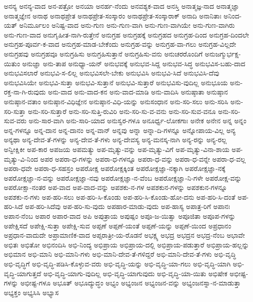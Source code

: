 {ಅನನ್ಯ
ಅನನ್ಯ-ವಾದ
ಅನ-ಪತ್ರೋ
ಅನಯಾ
ಅನರ್ಹ-ನೆಂದು
ಅನವಶ್ಯಕ-ವಾದ
ಅನಸ್ತಿ
ಅನಾತ್ಮಜ್ಞ-ನಾದ
ಅನಾತ್ಮಜ್ಞಾ
ಅನಾತ್ಮಜ್ಞೇನ
ಅನಾಥ
ಅನಾಥಪ್ರೇತ
ಅನಾಥಪ್ರೇತ-ಸಂಸ್ಕಾರಂ
ಅನಾಥಪ್ರೇತ-ಸಂಸ್ಕಾರಾಕ್
ಅನಾದಿ
ಅನಾನಿತಾಃ
ಅನಿಂದ-ಯತ್
ಅನಿರ್ಮೂಲಂ
ಅನಿಷ್ಟ-ವಾದ
ಅನು-ಗುಣ
ಅನು-ಗುಣ-ವಾಗಿ
ಅನು-ಗುಣ-ವಾಗಿಯೇ
ಅನು-ಗುಣ-ವಾಗಿರು
ಅನು-ಗುಣ-ವಾದ
ಅನುಗೃಹೀತ-ನಾಗಿ-ರುತ್ತೇನೆ
ಅನುಗ್ರಹ
ಅನುಗ್ರಹಕ್ಕೆ
ಅನುಗ್ರಹದ
ಅನುಗ್ರಹ-ದಿಂದ
ಅನುಗ್ರಹ-ದಿಂದಲೇ
ಅನುಗ್ರಹ-ಪೂರ್ವ-ಕ-ವಾದ
ಅನುಗ್ರಹ-ಮಾಡ-ಬೇಕೆಂದು
ಅನುಗ್ರಹ-ವನ್ನು
ಅನುಗ್ರಹ-ವಾ-ಗಲು
ಅನುಗ್ರಹ-ವಿಲ್ಲದೇ
ಅನುಗ್ರಹವು
ಅನುಗ್ರಹವೂ
ಅನುಗ್ರಹಿಸು
ಅನುಗ್ರಹಿಸುತ್ತಾನೆ
ಅನುಗ್ರಹಿಸು-ವನು
ಅನುಚರರೊಂದಿಗೆ
ಅನುಜಗ್ಮುರ್ಭಕ್ಷ-ಯಿತುಂ
ಅನುಜ್ಞಾ
ಅನು-ತಾಪ
ಅನುಧ್ಯಾ-ಯನ್
ಅನುಭವಕ್ಕೆ
ಅನುಭವ-ಸಿದ್ದ
ಅನುಭವ-ಸಿದ್ಧ
ಅನುಭವಿಸ-ಬಹು-ದಾದ
ಅನುಭವಿಸಲಾರೆ
ಅನುಭವಿ-ಸ-ಲಿಲ್ಲ
ಅನುಭವಿಸಲೇ-ಬೇಕು
ಅನುಭವಿಸಿ
ಅನುಭವಿ-ಸಿದೆ
ಅನುಭವಿಸಿ-ದೆವು
ಅನುಭವಿಸಿಯೇ
ಅನುಭವಿ-ಸುತ್ತಾ
ಅನುಭವಿ-ಸುತ್ತಾನೆ
ಅನುಭವಿ-ಸುತ್ತಾರೆ
ಅನುಭವಿಸು-ವುದಿಲ್ಲ
ಅನುಭೂಯ
ಅನು-ರಕ್ತ-ನಾ-ಗಿ-ರುವುದು
ಅನು-ವಾದ
ಅನು-ವಾದ-ಕನ
ಅನು-ವಾದ-ಮಾಡಿ
ಅನು-ವಾದಿಸಿ
ಅನುಷ್ಠಾತಾ
ಅನುಷ್ಠಾನ
ಅನುಷ್ಠಾನ-ವತಾಂ
ಅನುಷ್ಠಾನ-ವಿಧಿಜ್ಞೇನ
ಅನುಷ್ಠಾನ-ವಿಧಿ-ಯನ್ನು
ಅನುಸಂಧಾನ
ಅನು-ಸರಿ-ಸಲು
ಅನು-ಸರಿಸಿ
ಅನು-ಸರಿ-ಸುತ್ತಾ
ಅನು-ಸರಿ-ಸುತ್ತಾರೆ
ಅನು-ಸರಿ-ಸುತ್ತಿ-ರುವಿರಿ
ಅನು-ಸರಿ-ಸು-ವ-ವನು
ಅನು-ಸರಿ-ಸುವ-ವನೂ
ಅನು-ಸರಿ-ಸುವ-ವರು
ಅನು-ಸಾರ-ವಾಗಿ
ಅನು-ಸಾರಿ-ಯಾದ
ಅನುಸ್ವರ-ಗಳೂ
ಅನೂರ್ಧ್ವ-ಲೋಕಗಾಃ
ಅನೇಕ
ಅನೇನ
ಅನ್ನ
ಅನ್ನಂ
ಅನ್ನ-ಗಳನ್ನೂ
ಅನ್ನ-ದಾನ
ಅನ್ನ-ದಾನಂ
ಅನ್ನ-ವಾನ್
ಅನ್ನವು
ಅನ್ನಾ
ಅನ್ನಾ-ದಿ-ಗಳನ್ನೂ
ಅನ್ನೋಪಾಯ-ವಿಲ್ಲ
ಅನ್ಯ
ಅನ್ಯಥಾ
ಅನ್ಯ-ದೇವ-ತೆ-ಗಳನ್ನು
ಅನ್ಯ-ದೇವ-ತೆ-ಗಳು
ಅನ್ಯ-ದೇವಸ್ಯ
ಅನ್ಯ-ಮನಸ್ಕ-ನಾಗಿ
ಅನ್ಯ-ರನ್ನು
ಅನ್ಯ-ರಲ್ಲ
ಅನ್ವೀಕ್ಷಿಕೀ
ಅಪ-ಕಾರ
ಅಪಜಯ
ಅಪಮತ್ಯು
ಅಪ-ಮೃತ್ಯು-ವನ್ನು
ಅಪ-ಮೃತ್ಯು-ವಿಗೆ
ಅಪ-ಮೃತ್ಯು-ವಿನಾ-ಶಾಯ
ಅಪ-ಮೃತ್ಯು-ವಿ-ನಿಂದ
ಅಪರ
ಅಪರಾ-ಧ-ಗಳನ್ನು
ಅಪರಾ-ಧ-ಗಳನ್ನೂ
ಅಪರಾ-ಧ-ವನ್ನು
ಅಪರಾ-ಧ-ವನ್ನೇ
ಅಪರಾ-ಧ-ವಲ್ಲ
ಅಪರಾ-ಧವೇ
ಅಪರಾ-ಧ-ಸಹಸ್ರಂ
ಅಪರೋಕ್ಷ
ಅಪರೋಕ್ಷಕ್ಕಿಂತ
ಅಪರೋಕ್ಷಜ್ಞಾ-ನಕ್ಕಾಗಿ
ಅಪರೋಕ್ಷಜ್ಞಾ-ನಕ್ಕೆ
ಅಪರೋಕ್ಷಜ್ಞಾ-ನ-ವನ್ನು
ಅಪರೋಕ್ಷಜ್ಞಾ-ನವು
ಅಪರೋಕ್ಷಜ್ಞಾ-ನ-ವೆಂಬ
ಅಪರೋಕ್ಷಜ್ಞಾ-ನಿ-ಗಳೇ
ಅಪರೋಕ್ಷ-ವನ್ನು
ಅಪರೋಕ್ಷಾ-ನಂತರ
ಅಪ-ವಾದ
ಅಪ-ವಾದ-ವನ್ನು
ಅಪಶಕು-ನ-ಗಳ
ಅಪಶಕುನ-ಗಳನ್ನು
ಅಪಶಕುನ-ಗಳನ್ನೂ
ಅಪಶಕು-ನ-ಗಳು
ಅಪ-ಹರಿ-ಸಲು
ಅಪ-ಹರಿ-ಸಿ-ಕೊಂಡು
ಅಪ-ಹರಿ-ಸಿ-ಕೊಂಡು-ಹೋ-ದನು
ಅಪ-ಹರಿ-ಸಿ-ದಂತೆ
ಅಪ-ಹರಿ-ಸಿದೆ
ಅಪ-ಹರಿ-ಸಿದೆವು
ಅಪ-ಹರಿ-ಸು-ವುದು
ಅಪಹಾರ-ಮಾಡು-ವುದು
ಅಪ-ಹಾಸ್ಯ
ಅಪಾತ್ರ-ರಿಗೆ
ಅಪಾನಃ
ಅಪಾನ-ನೆಂಬ
ಅಪಾರ
ಅಪಾರ-ವಾದ
ಅಪಿ
ಅಪುತ್ರಾಯ
ಅಪುಷ್ಪಂ
ಅಪೂ-ಜ-ಯಿತ್ವಾ
ಅಪೂಜಿತಾ
ಅಪೂಪ-ಗಳನ್ನು
ಅಪೇಕ್ಷಿಸದೆ
ಅಪೇಕ್ಷಿ-ಸುತ್ತಾ
ಅಪೇಕ್ಷಿ-ಸುವ
ಅಪ್ಪಣೆ
ಅಪ್ಪಣೆ-ಯಂತೆ
ಅಪ್ಪಣೆ-ಯನ್ನು
ಅಪ್ಪಣೆ-ಯಿಂದ
ಅಪ್ರಧಾನಂ
ಅಪ್ರಧಾನ-ವಾದುದೇ
ಅಪ್ರಾಮಾಣಿಕ-ವಾದ
ಅಪ್ಸರಾತ್ರೀ-ಯ-ರೊಡನೆ
ಅಭಕ್ಷ್ಯ
ಅಭದ್ರ
ಅಭದ್ರನ
ಅಭದ್ರ-ನೆಂಬ
ಅಭಾವೇ
ಅಭಿತಃ
ಅಭಿತೋ
ಅಭಿನಂದಿಸಿ
ಅಭಿ-ನಿಂದ್ಯ
ಅಭಿಪ್ರಾಯ
ಅಭಿಪ್ರಾಯ-ದಲ್ಲಿ
ಅಭಿಪ್ರಾಯ-ಪಡುತ್ತಾರೆ
ಅಭಿಪ್ರಾಯ-ಹಲ್ಲನ್ನು
ಅಭಿಮಾನ
ಅಭಿ-ಮಾನಿ
ಅಭಿ-ಮಾನಿ-ಗಳು
ಅಭಿ-ಮಾನಿ-ದೇವ-ತೆ-ಗಳಿದ್ದರೆ
ಅಭಿ-ಮಾನಿ-ದೇವ-ತೆ-ಗಳು
ಅಭಿ-ವೃದ್ಧಿ
ಅಭಿ-ವೃದ್ಧಿಗೆ
ಅಭಿ-ವೃದ್ಧಿ-ಪಡಿಸಿ-ಕೊಳ್ಳುವ-ವರು
ಅಭಿ-ವೃದ್ಧಿ-ಯನ್ನು
ಅಭಿ-ವೃದ್ಧಿ-ಯಾ-ಗಲು
ಅಭಿ-ವೃದ್ಧಿ-ಯಾಗಿ
ಅಭಿ-ವೃದ್ಧಿ-ಯಾಗುತ್ತದೆ
ಅಭಿ-ವೃದ್ಧಿ-ಯಾಗು-ವುದಿಲ್ಲ
ಅಭಿ-ವೃದ್ಧಿ-ಯಾಗುವುದು
ಅಭಿ-ವೃದ್ಧಿ-ಯಾ-ಯಿತು
ಅಭಿಷೇಕ
ಅಭೀಷ್ಟ-ಗಳನ್ನು
ಅಭೀಷ್ಟ-ಗಳೂ
ಅಭೂತ್
ಅಭೂದ್ಯುದ್ಧಂ
ಅಭ್ಯಂ
ಅಭ್ಯಂಜನ
ಅಭ್ಯಂಜನ-ವನ್ನು
ಅಭ್ಯಂಜನಸ್ನಾ-ನ-ಮಾಡುತ್ತಾ
ಅಭ್ಯಕ್ತಂ
ಅಭ್ಯಸಿಸಿ
ಅಭ್ಯಾಸ
}
